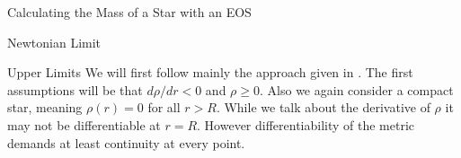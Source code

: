 \begin{section}{Calculating the Mass of a Star with an EOS}
\begin{subsection}{Newtonian Limit}
%
%
\end{subsection}
%
%
% 
%
%
\begin{subsection}{Upper Limits}
We will first follow mainly the approach given in \cite{waldGeneralRelativity1984}. The first assumptions will be that $d\rho/dr<0$ and $\rho\geq0$. Also we again consider a compact star, meaning $\rho(r)=0$ for all $r>R$. While we talk about the derivative of $\rho$ it may not be differentiable at $r=R$. However differentiability of the metric demands at least continuity at every point. 

\end{subsection}
\end{section}
